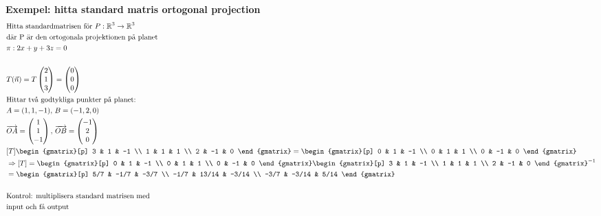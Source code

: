 \begin{multicols}{2}
\textbf{Exempel: hitta standard matris ortogonal projection}
\begin{align*}
  &\text{Hitta standardmatrisen för } P:\mathbb{R}^3 \to \mathbb{R}^3 \\
  &\text{där P är den ortogonala projektionen på planet} \\
  &\pi: 2 x + y + 3 z = 0 \\
  &\\
  &T(\vec{n})=T\begin{pmatrix} 2 \\ 1 \\ 3 \end{pmatrix} = \begin{pmatrix} 0 \\ 0 \\ 0 \end{pmatrix} \\
  &\text{Hittar två godtykliga punkter på planet: }  \\
  &A=(1,1,-1), \, B=(-1,2,0) \\
  &\overrightarrow{OA} = \begin{pmatrix} 1 \\ 1 \\ -1 \end{pmatrix}, \,
  \overrightarrow{OB} = \begin{pmatrix} -1 \\ 2 \\ 0 \end{pmatrix} \\
  &[T]
  \begin{gmatrix}[p]
    3 &  1 & -1  \\
    1 &  1 &  1  \\
    2 & -1 &  0
  \end{gmatrix} =
  \begin{gmatrix}[p]
    0 &  1 & -1  \\
    0 &  1 &  1  \\
    0 & -1 &  0
  \end{gmatrix}   \\
  &\Rightarrow[T] =
  \begin{gmatrix}[p]
    0 &  1 & -1  \\
    0 &  1 &  1  \\
    0 & -1 &  0
  \end{gmatrix}
  {  \begin{gmatrix}[p]
    3 &  1 & -1  \\
    1 &  1 &  1  \\
    2 & -1 &  0
  \end{gmatrix}}^{-1} \\
  &=\begin{gmatrix}[p]
    5/7 & -1/7  & -3/7  \\
   -1/7 & 13/14 & -3/14 \\
   -3/7 & -3/14 &  5/14
  \end{gmatrix} \\
  &\\
  &\text{Kontrol: multiplisera standard matrisen med} \\
  &\text{input och få output} \\
\end{align*}


\end{multicols}
